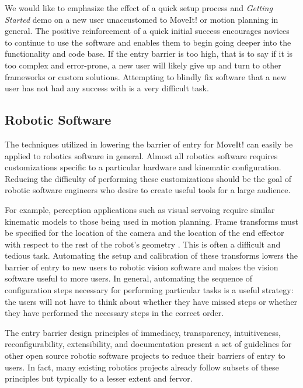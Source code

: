 \documentclass[10pt,journal,compsoc]{joser1}
\begin{document}
{We would like to emphasize the effect of a quick setup process and \textit{Getting Started} demo on a new user unaccustomed to MoveIt! or motion planning in general. The positive reinforcement of a quick initial success encourages novices to continue to use the software and enables them to begin going deeper into the functionality and code base. If the entry barrier is too high, that is to say if it is too complex and error-prone, a new user will likely give up and turn to other frameworks or custom solutions. Attempting to blindly fix software that a new user has not had any success with is a very difficult task.

\subsection{Robotic Software}
\label{sec::robotic_discussion}

The techniques utilized in lowering the barrier of entry for MoveIt! can easily be applied to robotics software in general. Almost all robotics software requires customizations specific to a particular hardware and kinematic configuration. Reducing the difficulty of performing these customizations should be the goal of robotic software engineers who desire to create useful tools for a large audience. 

For example, perception applications such as visual servoing require similar kinematic models to those being used in motion planning. Frame transforms must be specified for the location of the camera and the location of the end effector with respect to the rest of the robot's geometry \cite{visual_servoing}. This is often a difficult and tedious task. Automating the setup and calibration of these transforms lowers the barrier of entry to new users to robotic vision software and makes the vision software useful to more users. In general, automating the sequence of configuration steps necessary for performing particular tasks is a useful strategy: the users will not have to think about whether they have missed steps or whether they have performed the necessary steps in the correct order. 

The entry barrier design principles of immediacy, transparency, intuitiveness, reconfigurability, extensibility, and documentation present a set of guidelines for other open source robotic software projects to reduce their barriers of entry to users. In fact, many existing robotics projects already follow subsets of these principles but typically to a lesser extent and fervor.

}
\end{document}
